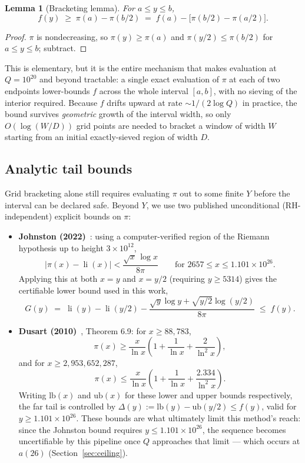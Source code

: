 \documentclass[11pt]{amsart}
\newtheorem{lemma}{Lemma}
\newcommand{\pcount}{\pi}
\newcommand{\li}{\operatorname{li}}
\begin{document}
\begin{lemma}[Bracketing lemma]
\label{lem:bracket}
For $a \leq y \leq b$,
\[
  f(y) \;\geq\; \pcount(a) - \pcount(b/2) \;=\; f(a) - \bigl[\pcount(b/2) -
  \pcount(a/2)\bigr].
\]
\end{lemma}

\begin{proof}
$\pcount$ is nondecreasing, so $\pcount(y) \geq \pcount(a)$ and
$\pcount(y/2) \leq \pcount(b/2)$ for $a \leq y \leq b$; subtract.
\end{proof}

This is elementary, but it is the entire mechanism that makes evaluation
at $Q = 10^{20}$ and beyond tractable: a single exact evaluation of
$\pcount$ at each of two endpoints lower-bounds $f$ across the whole
interval $[a,b]$, with no sieving of the interior required. Because $f$
drifts upward at rate $\sim 1/(2\log Q)$ in practice, the bound survives
\emph{geometric} growth of the interval width, so only
$O(\log(W/D))$ grid points are needed to bracket a window of width $W$
starting from an initial exactly-sieved region of width $D$.

\subsection{Analytic tail bounds}

Grid bracketing alone still requires evaluating $\pcount$ out to some
finite $Y$ before the interval can be declared safe. Beyond $Y$, we use
two published unconditional (RH-independent) explicit bounds on
$\pcount$:

\begin{itemize}
  \item \textbf{Johnston (2022)}~\cite{johnston2022}: using a
  computer-verified region of the Riemann hypothesis up to height
  $3\times10^{12}$,
  \[
    |\pcount(x) - \li(x)| < \frac{\sqrt{x}\,\log x}{8\pi}
    \qquad \text{for } 2657 \leq x \leq 1.101\times10^{26}.
  \]
  Applying this at both $x=y$ and $x=y/2$ (requiring $y \geq 5314$) gives
  the certifiable lower bound used in this work,
  \[
    G(y) \;=\; \li(y) - \li(y/2) -
    \frac{\sqrt{y}\log y + \sqrt{y/2}\log(y/2)}{8\pi} \;\leq\; f(y).
  \]
  \item \textbf{Dusart (2010)}~\cite{dusart2010}, Theorem 6.9: for
  $x \geq 88{,}783$,
  \[
    \pcount(x) \geq \frac{x}{\ln x}\left(1+\frac1{\ln x}+\frac2{\ln^2 x}\right),
  \]
  and for $x \geq 2{,}953{,}652{,}287$,
  \[
    \pcount(x) \leq \frac{x}{\ln x}\left(1+\frac1{\ln x}+\frac{2.334}{\ln^2 x}\right).
  \]
  Writing $\mathrm{lb}(x)$ and $\mathrm{ub}(x)$ for these lower and
  upper bounds respectively, the far tail is controlled by
  $\Delta(y) := \mathrm{lb}(y) - \mathrm{ub}(y/2) \leq f(y)$, valid for
  $y \geq 1.101\times10^{26}$. These bounds are what ultimately limit
  this method's reach: since the Johnston bound requires $y \leq
  1.101\times10^{26}$, the sequence becomes uncertifiable by this
  pipeline once $Q$ approaches that limit --- which occurs at $a(26)$
  (Section~\ref{sec:ceiling}).
\end{itemize}
\end{document}
